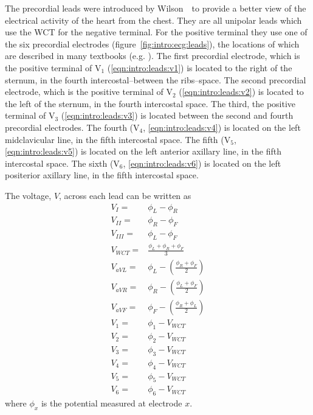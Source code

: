 The precordial leads were introduced by Wilson~\cite{Wilson1944}\ to provide a
better view of the electrical activity of the heart from the chest.
They are all unipolar leads which use the WCT for the negative
terminal.
For the positive terminal they use one of the six precordial electrodes
(figure~\ref{fig:intro:ecg:leads}), the locations of which are described in
many textbooks (e.g.  \cite{Hampton2008}).
The first precordial electrode, which is the positive terminal of
$\text{V}_{\text{1}}$ (\ref{eqn:intro:leads:v1}) is located to the right of the
sternum, in the fourth intercostal--between the ribs--space.
The second precordial electrode, which is the positive terminal of
$\text{V}_{\text{2}}$ (\ref{eqn:intro:leads:v2}) is located to the left of the
sternum, in the fourth intercostal space.
The third, the positive terminal of $\text{V}_{\text{3}}$
(\ref{eqn:intro:leads:v3}) is located between the second and fourth precordial
electrodes.
The fourth ($\text{V}_{\text{4}}$, \ref{eqn:intro:leads:v4}) is located on the
left midclavicular line, in the fifth intercostal space.
The fifth ($\text{V}_{\text{5}}$, \ref{eqn:intro:leads:v5}) is located on the
left anterior axillary line, in the fifth intercostal space.
The sixth ($\text{V}_{\text{6}}$, \ref{eqn:intro:leads:v6}) is located on the
left positerior axillary line, in the fifth intercostal space.

The voltage, $V$, across each lead can be written as
\begin{subequations} \label{eqn:intro:leads}
\begin{align}
V_{I}  = &\phi_{L} - \phi_{R}\label{eqn:intro:leads:i}\\
V_{II}  = &\phi_{R} - \phi_{F}\label{eqn:intro:leads:ii} \\
V_{III}  = &\phi_{L} - \phi_{F}\label{eqn:intro:leads:iii}\\
V_{WCT}  = &\frac{\phi_{L} + \phi_{R} + \phi_{F}}{3}\label{eqn:intro:leads:wct}\\
V_{aVL} = &\phi_{L} - \left(\frac{\phi_{R} + \phi_{F}}{2}\right) \label{eqn:intro:leads:avl}\\
V_{aVR} = &\phi_{R} - \left(\frac{\phi_{L} + \phi_{F}}{2}\right)\label{eqn:intro:leads:avr} \\
V_{aVF} = & \phi_{F} - \left(\frac{\phi_{R} + \phi_{L}}{2}\right)\label{eqn:intro:leads:avf}\\
V_{1} = & \phi_1 - V_{WCT} \label{eqn:intro:leads:v1}\\
V_{2} = & \phi_2 - V_{WCT} \label{eqn:intro:leads:v2}\\
V_{3} = & \phi_3 - V_{WCT} \label{eqn:intro:leads:v3}\\
V_{4} = & \phi_4 - V_{WCT} \label{eqn:intro:leads:v4}\\
V_{5} = & \phi_5 - V_{WCT} \label{eqn:intro:leads:v5}\\
V_{6} = & \phi_6 - V_{WCT} \label{eqn:intro:leads:v6}
\end{align}
\end{subequations}
where $\phi_x$ is the potential measured at electrode $x$.

